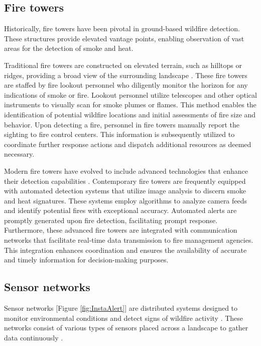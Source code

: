 \documentclass[
  12 pt,
]{Nemilov}
\begin{document}
\subsection{Fire towers}\label{fire-towers}

Historically, fire towers have been pivotal in ground-based wildfire detection. These structures provide elevated vantage points, enabling observation of vast areas for the detection of smoke and heat.

Traditional fire towers are constructed on elevated terrain, such as hilltops or ridges, providing a broad view of the surrounding landscape \citep{ankur2018generation, berryoung2021little}. These fire towers are staffed by fire lookout personnel who diligently monitor the horizon for any indications of smoke or fire. Lookout personnel utilize telescopes and other optical instruments to visually scan for smoke plumes or flames. This method enables the identification of potential wildfire locations and initial assessments of fire size and behavior. Upon detecting a fire, personnel in fire towers manually report the sighting to fire control centers. This information is subsequently utilized to coordinate further response actions and dispatch additional resources as deemed necessary.

Modern fire towers have evolved to include advanced technologies that enhance their detection capabilities \citep{ccetin2013video}. Contemporary fire towers are frequently equipped with automated detection systems that utilize image analysis to discern smoke and heat signatures. These systems employ algorithms to analyze camera feeds and identify potential fires with exceptional accuracy. Automated alerts are promptly generated upon fire detection, facilitating prompt response. Furthermore, these advanced fire towers are integrated with communication networks that facilitate real-time data transmission to fire management agencies. This integration enhances coordination and ensures the availability of accurate and timely information for decision-making purposes.

\subsection{Sensor networks}\label{sensor-networks}

Sensor networks {[}Figure \ref{fig:InstaAlert}{]} are distributed systems designed to monitor environmental conditions and detect signs of wildfire activity \citep{dogra2021review}. These networks consist of various types of sensors placed across a landscape to gather data continuously \citep{allison2016airborne, rahman2021computer, vejmelka2016data}.
\end{document}
